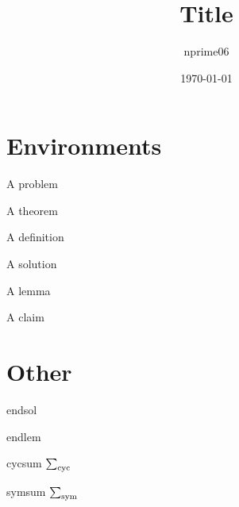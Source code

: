 \documentclass[10pt,a4paper]{article}
\author{nprime06}
\title{Title}
\date{\today}
\begin{document}
\maketitle
\begin{flushleft}

\tableofcontents


\section{Environments}

\begin{question}[Source]
A problem
\end{question}

\begin{theorem}[Name]
A theorem
\end{theorem}

\begin{definition}[Definition]
A definition
\end{definition}

\begin{solution}[Solution]
A solution

\begin{lemma}[Lemma]
A lemma
\end{lemma}

\begin{claim}[Claim]
A claim
\end{claim}
\end{solution}

\begin{comment}[Comment/Note]
A comment/note
\end{comment}

\section{Other}


\smallskip


\bigskip

endsol\endsol

\smallskip

endlem\endlem

\bigskip

cycsum $\sum_{\text{cyc}}$

\smallskip

symsum $\sum_{\text{sym}}$ 

\end{flushleft}
\end{document}
